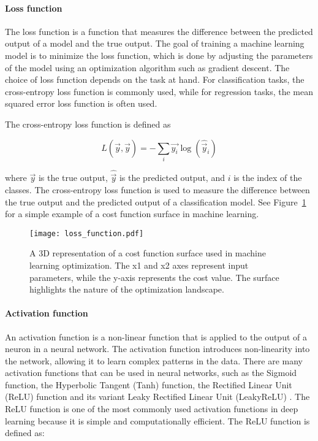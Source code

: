 \paragraph{Loss function}
The loss function is a function that measures the difference between the predicted output of a model and the true output. The goal of training a machine learning model is to minimize the loss function, which is done by adjusting the parameters of the model using an optimization algorithm such as gradient descent. The choice of loss function depends on the task at hand. For classification tasks, the cross-entropy loss function is commonly used, while for regression tasks, the mean squared error loss function is often used.

The cross-entropy loss function is defined as 

$$
    L(\vec{y}, \hat{\vec{y}}) = -\sum_{i} \vec{y_i} \log(\hat{\vec{y}}_i)
$$

where $\vec{y}$ is the true output, $\hat{\vec{y}}$ is the predicted output, and $i$ is the index of the classes. The cross-entropy loss function is used to measure the difference between the true output and the predicted output of a classification model. See Figure~\ref{fig:loss_function} for a simple example of a cost function surface in machine learning.

\begin{figure}[H]
    \centering
    \texttt{[image: loss\_function.pdf]}
    \caption{A 3D representation of a cost function surface used in machine learning optimization. The x1 and x2 axes represent input parameters, while the y-axis represents the cost value. The surface highlights the nature of the optimization landscape.}
    \label{fig:loss_function}
\end{figure}

\paragraph{Activation function}
An activation function is a non-linear function that is applied to the output of a neuron in a neural network. The activation function introduces non-linearity into the network, allowing it to learn complex patterns in the data. There are many activation functions that can be used in neural networks, such as the Sigmoid function, the Hyperbolic Tangent (Tanh) function, the Rectified Linear Unit (ReLU) function \cite{nair2010rectified} and its variant Leaky Rectified Linear Unit (LeakyReLU) \cite{xu2015empirical}. The ReLU function is one of the most commonly used activation functions in deep learning because it is simple and computationally efficient. The ReLU function is defined as:

